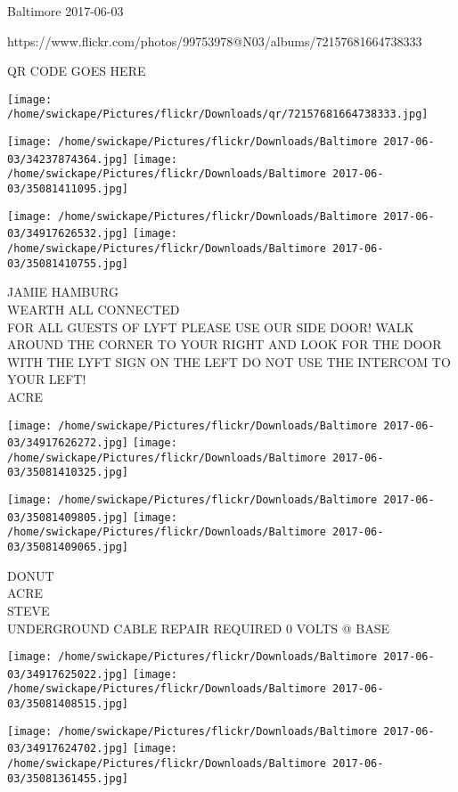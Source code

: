 \documentclass[10pt,letterpaper]{article}
\begin{document}
Baltimore 2017-06-03

https://www.flickr.com/photos/99753978@N03/albums/72157681664738333

QR CODE GOES HERE

\texttt{[image: /home/swickape/Pictures/flickr/Downloads/qr/72157681664738333.jpg]}
\pagebreak

\texttt{[image: /home/swickape/Pictures/flickr/Downloads/Baltimore 2017-06-03/34237874364.jpg]}
\texttt{[image: /home/swickape/Pictures/flickr/Downloads/Baltimore 2017-06-03/35081411095.jpg]}

\texttt{[image: /home/swickape/Pictures/flickr/Downloads/Baltimore 2017-06-03/34917626532.jpg]}
\texttt{[image: /home/swickape/Pictures/flickr/Downloads/Baltimore 2017-06-03/35081410755.jpg]}

JAMIE HAMBURG\\
WEARTH ALL CONNECTED\\
FOR ALL GUESTS OF LYFT PLEASE USE OUR SIDE DOOR!  WALK AROUND THE CORNER TO YOUR RIGHT AND LOOK FOR THE DOOR WITH THE LYFT SIGN ON THE LEFT DO NOT USE THE INTERCOM TO YOUR LEFT!\\
ACRE\\
\pagebreak

\texttt{[image: /home/swickape/Pictures/flickr/Downloads/Baltimore 2017-06-03/34917626272.jpg]}
\texttt{[image: /home/swickape/Pictures/flickr/Downloads/Baltimore 2017-06-03/35081410325.jpg]}

\texttt{[image: /home/swickape/Pictures/flickr/Downloads/Baltimore 2017-06-03/35081409805.jpg]}
\texttt{[image: /home/swickape/Pictures/flickr/Downloads/Baltimore 2017-06-03/35081409065.jpg]}

DONUT\\
ACRE\\
STEVE\\
UNDERGROUND CABLE REPAIR REQUIRED 0 VOLTS @ BASE\\
\pagebreak

\texttt{[image: /home/swickape/Pictures/flickr/Downloads/Baltimore 2017-06-03/34917625022.jpg]}
\texttt{[image: /home/swickape/Pictures/flickr/Downloads/Baltimore 2017-06-03/35081408515.jpg]}

\texttt{[image: /home/swickape/Pictures/flickr/Downloads/Baltimore 2017-06-03/34917624702.jpg]}
\texttt{[image: /home/swickape/Pictures/flickr/Downloads/Baltimore 2017-06-03/35081361455.jpg]}
\end{document}

